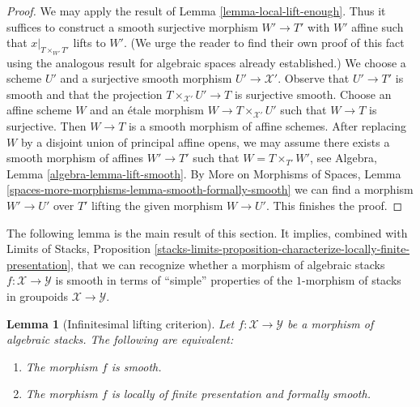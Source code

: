 \documentclass{stacks-project}
\theoremstyle{plain}
\newtheorem{lemma}[subsection]{Lemma}
\theoremstyle{definition}
\theoremstyle{remark}
\numberwithin{equation}{subsection}
\begin{document}
\begin{proof}
We may apply the result of Lemma \ref{lemma-local-lift-enough}.
Thus it suffices to construct a smooth surjective morphism
$W' \to T'$ with $W'$ affine such that
$x|_{T \times_{W'} T'}$ lifts to $W'$.
(We urge the reader to find their own proof of this fact
using the analogous result for algebraic spaces already
established.) We choose a
scheme $U'$ and a surjective smooth morphism $U' \to \mathcal{X}'$.
Observe that $U' \to T'$ is smooth and that the projection
$T \times_{\mathcal{X}'} U' \to T$ is surjective smooth.
Choose an affine scheme $W$ and an \'etale morphism
$W \to T \times_{\mathcal{X}'} U'$ such that $W \to T$
is surjective. Then $W \to T$ is a smooth morphism of
affine schemes. After replacing $W$ by a disjoint union of
principal affine opens, we may assume there exists a
smooth morphism of affines $W' \to T'$ such that
$W = T \times_{T'} W'$, see Algebra, Lemma \ref{algebra-lemma-lift-smooth}.
By More on Morphisms of Spaces, Lemma
\ref{spaces-more-morphisms-lemma-smooth-formally-smooth}
we can find a morphism $W' \to U'$ over $T'$ lifting
the given morphism $W \to U'$. This finishes the proof.
\end{proof}

\noindent
The following lemma is the main result of this section.
It implies, combined with
Limits of Stacks, Proposition
\ref{stacks-limits-proposition-characterize-locally-finite-presentation},
that we can recognize whether a morphism of algebraic stacks
$f : \mathcal{X} \to \mathcal{Y}$ is smooth in terms of
``simple'' properties of the $1$-morphism of stacks in groupoids
$\mathcal{X} \to \mathcal{Y}$.

\begin{lemma}[Infinitesimal lifting criterion]
\label{lemma-smooth-formally-smooth}
Let $f : \mathcal{X} \to \mathcal{Y}$ be a morphism of algebraic stacks.
The following are equivalent:
\begin{enumerate}
\item The morphism $f$ is smooth.
\item The morphism $f$ is locally of finite presentation and
formally smooth.
\end{enumerate}
\end{lemma}
\end{document}
